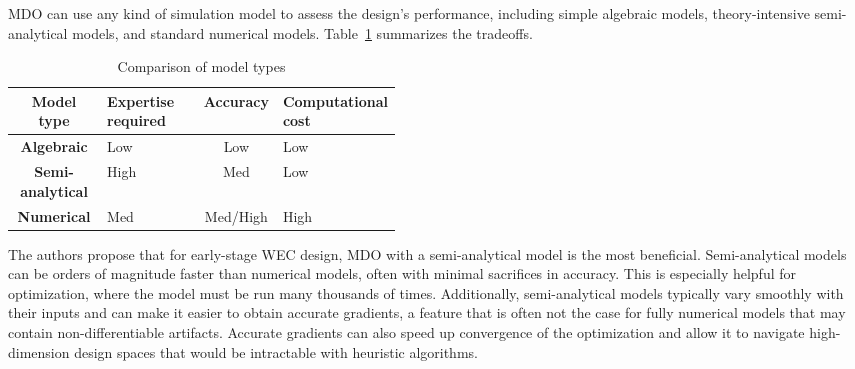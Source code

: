 

MDO can use any kind of simulation model to assess the design's performance, including simple algebraic models, theory-intensive semi-analytical models, and standard numerical models.
Table~\ref{tab:model-types} summarizes the tradeoffs.
\begin{table}
    \centering
    \begin{tabular}{c>{\centering\arraybackslash}p{0.25\linewidth}c>{\centering\arraybackslash}p{0.2\linewidth}} 
         \textbf{Model type}&  \textbf{Expertise required}&  \textbf{Accuracy}&  \textbf{Computational cost}\\ \hline
         \textbf{Algebraic}&  Low&  Low&  Low\\ 
         \textbf{Semi-analytical}&  High&  Med&  Low\\ 
         \textbf{Numerical}&  Med&  Med/High&  High\\ 
    \end{tabular}
    \caption{Comparison of model types}
    \label{tab:model-types}
\end{table}
The authors propose that for early-stage WEC design, MDO with a semi-analytical model is the most beneficial.
Semi-analytical models can be orders of magnitude faster than numerical models, often with minimal sacrifices in accuracy.
This is especially helpful for optimization, where the model must be run many thousands of times.
Additionally, semi-analytical models typically vary smoothly with their inputs and can make it easier to obtain accurate gradients, a feature that is often not the case for fully numerical models that may contain non-differentiable artifacts.
Accurate gradients can also speed up convergence of the optimization and allow it to navigate high-dimension design spaces that would be intractable with heuristic algorithms.

